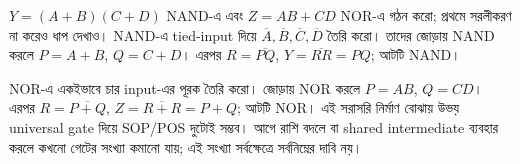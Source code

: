 $Y=(A+B)(C+D)$ NAND-এ এবং $Z=AB+CD$ NOR-এ গঠন করো; প্রথমে সরলীকরণ না করেও ধাপ দেখাও।
\chThreeAnswer NAND-এ tied-input দিয়ে $\overline A,\overline B,\overline C,\overline D$ তৈরি করো। তাদের জোড়ায় NAND করলে $P=A+B$, $Q=C+D$। এরপর $R=\overline{PQ}$, $Y=\overline{RR}=PQ$; আটটি NAND।

NOR-এ একইভাবে চার input-এর পূরক তৈরি করো। জোড়ায় NOR করলে $P=AB$, $Q=CD$। এরপর $R=\overline{P+Q}$, $Z=\overline{R+R}=P+Q$; আটটি NOR। এই সরাসরি নির্মাণ বোঝায় উভয় universal gate দিয়ে SOP/POS দুটোই সম্ভব। আগে রাশি বদলে বা shared intermediate ব্যবহার করলে কখনো গেটের সংখ্যা কমানো যায়; এই সংখ্যা সর্বক্ষেত্রে সর্বনিম্নের দাবি নয়।
